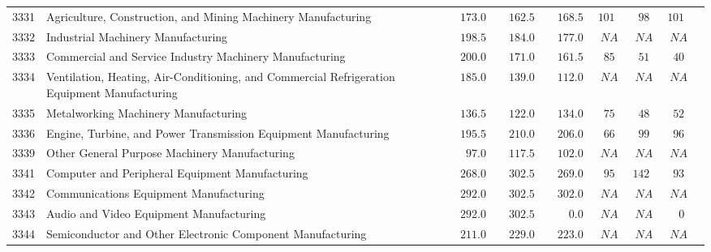 \documentclass[9pt, oneside]{article}   	%
\begin{document}
\begin{longtable}{lp{3.5 in}ccccccc}
3331  & Agriculture, Construction, and Mining Machinery Manufacturing & $\phantom{00}173.0$ & $\phantom{00}162.5$ & $\phantom{00}168.5$ & $101$ & $\phantom{0}98$ & $101$ \\
3332  & Industrial Machinery Manufacturing & $\phantom{00}198.5$ & $\phantom{00}184.0$ & $\phantom{00}177.0$ & $\phantom{0}NA$ & $\phantom{0}NA$ & $\phantom{0}NA$ \\
3333  & Commercial and Service Industry Machinery Manufacturing & $\phantom{00}200.0$ & $\phantom{00}171.0$ & $\phantom{00}161.5$ & $\phantom{0}85$ & $\phantom{0}51$ & $\phantom{0}40$ \\
3334  & Ventilation, Heating, Air-Conditioning, and Commercial Refrigeration Equipment Manufacturing & $\phantom{00}185.0$ & $\phantom{00}139.0$ & $\phantom{00}112.0$ & $\phantom{0}NA$ & $\phantom{0}NA$ & $\phantom{0}NA$ \\
3335  & Metalworking Machinery Manufacturing & $\phantom{00}136.5$ & $\phantom{00}122.0$ & $\phantom{00}134.0$ & $\phantom{0}75$ & $\phantom{0}48$ & $\phantom{0}52$ \\
3336  & Engine, Turbine, and Power Transmission Equipment Manufacturing & $\phantom{00}195.5$ & $\phantom{00}210.0$ & $\phantom{00}206.0$ & $\phantom{0}66$ & $\phantom{0}99$ & $\phantom{0}96$ \\
3339  & Other General Purpose Machinery Manufacturing & $\phantom{000}97.0$ & $\phantom{00}117.5$ & $\phantom{00}102.0$ & $\phantom{0}NA$ & $\phantom{0}NA$ & $\phantom{0}NA$ \\
3341  & Computer and Peripheral Equipment Manufacturing & $\phantom{00}268.0$ & $\phantom{00}302.5$ & $\phantom{00}269.0$ & $\phantom{0}95$ & $142$ & $\phantom{0}93$ \\
3342  & Communications Equipment Manufacturing & $\phantom{00}292.0$ & $\phantom{00}302.5$ & $\phantom{00}302.0$ & $\phantom{0}NA$ & $\phantom{0}NA$ & $\phantom{0}NA$ \\
3343  & Audio and Video Equipment Manufacturing & $\phantom{00}292.0$ & $\phantom{00}302.5$ & $\phantom{0000}0.0$ & $\phantom{0}NA$ & $\phantom{0}NA$ & $\phantom{00}0$ \\
3344  & Semiconductor and Other Electronic Component Manufacturing & $\phantom{00}211.0$ & $\phantom{00}229.0$ & $\phantom{00}223.0$ & $\phantom{0}NA$ & $\phantom{0}NA$ & $\phantom{0}NA$ \\

\end{longtable}
\end{document}
